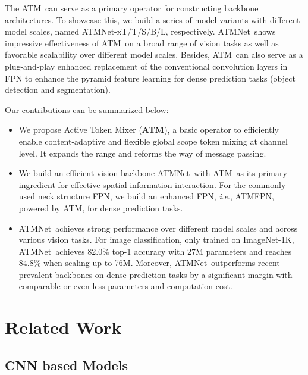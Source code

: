 \documentclass[letterpaper]{article} \usepackage{aaai23v}  \usepackage{times}  \usepackage{helvet}  \usepackage{courier}  \usepackage[hyphens]{url}  \usepackage{graphicx} \urlstyle{rm} \def\UrlFont{\rm}  \usepackage{caption} \frenchspacing  \setlength{\pdfpagewidth}{8.5in}  \setlength{\pdfpageheight}{11in}  \usepackage{algorithm}
\newcommand{\ieno}{\textit{i}.\textit{e}.}
\newcommand{\ours}{{ATMNet}}
\newcommand{\ourcore}{{ATM}}
\newcommand{\ourop}{{ATM}}
\begin{document}
The \ourop~can serve as a primary operator for constructing backbone architectures. To showcase this, we build a series of model variants with different model scales, named \ours-xT/T/S/B/L, respectively. \ours~shows impressive effectiveness of \ourop~on a broad range of vision tasks 
as well as favorable scalability over different model scales. Besides, \ourop~can also serve as a plug-and-play enhanced replacement 
of the conventional convolution layers in FPN \cite{lin2017feature} to enhance the pyramid feature learning for dense prediction tasks (object detection and segmentation).

Our contributions can be summarized below:
\begin{itemize}[noitemsep,nolistsep,leftmargin=*]
\item We propose Active Token Mixer (\textbf{\ourcore}), a basic operator to efficiently enable content-adaptive and flexible global scope token mixing at channel level. It expands the range and reforms the way of message passing.
\item We build an efficient vision backbone \ours~with \ourop~as its primary ingredient for effective spatial information interaction. For the commonly used neck structure FPN, we build an enhanced FPN, \ieno, ATMFPN, powered by ATM, for dense prediction tasks.
\item \ours~achieves strong performance over different model scales and across various vision tasks. For image classification, only trained on ImageNet-1K, 
\ours~achieves 82.0\% top-1 accuracy with 27M parameters and reaches 84.8\% when scaling up to 76M. Moreover, \ours~outperforms recent prevalent backbones on dense prediction tasks by a significant margin with comparable or even less parameters and computation cost.
\end{itemize}

\section{Related Work}

\subsection{CNN based Models}
\end{document}
